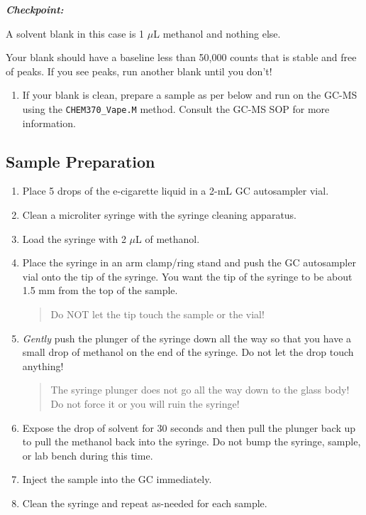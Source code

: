 \documentclass[]{tufte-book}
\providecommand{\tightlist}{%
  \setlength{\itemsep}{0pt}\setlength{\parskip}{0pt}}
\begin{document}
\begin{marginfigure}
  \textbf{\emph{Checkpoint:}}
  
  A solvent blank in this case is 1 \(\mu\)L methanol and nothing else.
  
  Your blank should have a baseline less than 50,000 counts that is stable
  and free of peaks. If you see peaks, run another blank until you don't!
  \end{marginfigure}

\begin{enumerate}
\def\labelenumi{\arabic{enumi}.}
\setcounter{enumi}{1}
\tightlist
\item
  If your blank is clean, prepare a sample as per below and run on the GC-MS using the \texttt{CHEM370\_Vape.M} method. Consult the GC-MS SOP for more information.
\end{enumerate}

\hypertarget{sample-preparation}{%
\subsection{Sample Preparation}\label{sample-preparation}}

\begin{enumerate}
\def\labelenumi{\arabic{enumi}.}
\item
  Place 5 drops of the e-cigarette liquid in a 2-mL GC autosampler vial.
\item
  Clean a microliter syringe with the syringe cleaning apparatus.
\item
  Load the syringe with 2 \(\mu\)L of methanol.
\item
  Place the syringe in an arm clamp/ring stand and push the GC autosampler vial onto the tip of the syringe. You want the tip of the syringe to be about 1.5 mm from the top of the sample.

  \begin{quote}
  Do NOT let the tip touch the sample or the vial!
  \end{quote}
\item
  \emph{Gently} push the plunger of the syringe down all the way so that you have a small drop of methanol on the end of the syringe. Do not let the drop touch anything!

  \begin{quote}
  The syringe plunger does not go all the way down to the glass body! Do not force it or you will ruin the syringe!
  \end{quote}
\item
  Expose the drop of solvent for 30 seconds and then pull the plunger back up to pull the methanol back into the syringe. Do not bump the syringe, sample, or lab bench during this time.
\item
  Inject the sample into the GC immediately.
\item
  Clean the syringe and repeat as-needed for each sample.
\end{enumerate}
\end{document}
